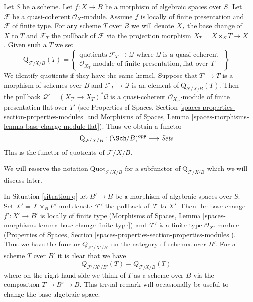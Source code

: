 \begin{situation}
\label{situation-q}
Let $S$ be a scheme.
Let $f : X \to B$ be a morphism of algebraic spaces over $S$.
Let $\mathcal{F}$ be a quasi-coherent $\mathcal{O}_X$-module.
Assume $f$ is locally of finite presentation and $\mathcal{F}$ of finite type.
For any scheme $T$ over $B$ we will denote $X_T$ the base change of
$X$ to $T$ and $\mathcal{F}_T$ the pullback
of $\mathcal{F}$ via the projection morphism $X_T = X \times_S T \to X$.
Given such a $T$ we set
$$
\text{Q}_{\mathcal{F}/X/B}(T) =
\left\{
\begin{matrix}
\text{quotients }\mathcal{F}_T \to \mathcal{Q}\text{ where }
\mathcal{Q}\text{ is a quasi-coherent }\\
\mathcal{O}_{X_T}\text{-module of finite presentation, flat over }T
\end{matrix}
\right\}
$$
We identify quotients if they have the same kernel. Suppose
that $T' \to T$ is a morphism of schemes over $B$ and
$\mathcal{F}_T \to \mathcal{Q}$ is an element of
$\text{Q}_{\mathcal{F}/X/B}(T)$. Then the pullback
$\mathcal{Q}' = (X_{T'} \to X_T)^*\mathcal{Q}$ is a quasi-coherent
$\mathcal{O}_{X_{T'}}$-module of finite presentation flat over $T'$
(see Properties of Spaces, Section
\ref{spaces-properties-section-properties-modules}
and
Morphisms of Spaces, Lemma
\ref{spaces-morphisms-lemma-base-change-module-flat}).
Thus we obtain a functor
\begin{equation}
\label{equation-quot}
\text{Q}_{\mathcal{F}/X/B} : (\Sch/B)^{opp} \longrightarrow \textit{Sets}
\end{equation}
This is the functor of quotients of $\mathcal{F}/X/B$.
\end{situation}

\noindent
We will reserve the notation $\text{Quot}_{\mathcal{F}/X/B}$ for a
subfunctor of $\text{Q}_{\mathcal{F}/X/B}$ which we will discuss later.

\begin{remark}
\label{remark-q-base-change}
In Situation \ref{situation-q} let $B' \to B$ be a morphism of
algebraic spaces over $S$. Set $X' = X \times_B B'$ and denote
$\mathcal{F}'$ the pullback of $\mathcal{F}$ to $X'$. Then the
base change $f' : X' \to B'$ is locally of finite type
(Morphisms of Spaces, Lemma
\ref{spaces-morphisms-lemma-base-change-finite-type})
and $\mathcal{F}'$ is a finite type $\mathcal{O}_{X'}$-module
(Properties of Spaces, Section
\ref{spaces-properties-section-properties-modules}).
Thus we have the functor $Q_{\mathcal{F}'/X'/B'}$ on
the category of schemes over $B'$. For a scheme $T$ over $B'$
it is clear that we have
$$
Q_{\mathcal{F}'/X'/B'}(T) = Q_{\mathcal{F}/X/B}(T)
$$
where on the right hand side we think of $T$ as a scheme over $B$
via the composition $T \to B' \to B$. This trivial remark
will occasionally be useful to change the base algebraic space.
\end{remark}

